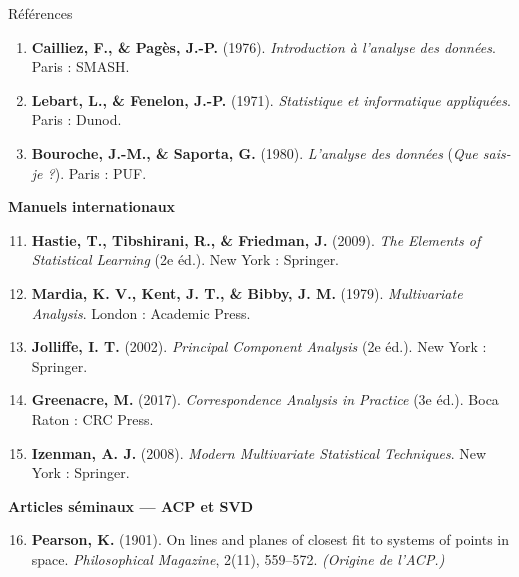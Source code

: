 \begin{frame}[allowframebreaks]{Références}
\begin{enumerate}
  \item \textbf{Cailliez, F., \& Pagès, J.-P.} (1976).
        \textit{Introduction à l'analyse des données}.
        Paris : SMASH.

  \item \textbf{Lebart, L., \& Fenelon, J.-P.} (1971).
        \textit{Statistique et informatique appliquées}.
        Paris : Dunod.

  \item \textbf{Bouroche, J.-M., \& Saporta, G.} (1980).
        \textit{L'analyse des données} (\textit{Que sais-je ?}).
        Paris : PUF.
\end{enumerate}

\framebreak

\textbf{\large Manuels internationaux}\\[6pt]

\begin{enumerate}
  \setcounter{enumi}{10}
  \item \textbf{Hastie, T., Tibshirani, R., \& Friedman, J.} (2009).
        \textit{The Elements of Statistical Learning} (2e éd.).
        New York : Springer.

  \item \textbf{Mardia, K. V., Kent, J. T., \& Bibby, J. M.} (1979).
        \textit{Multivariate Analysis}. London : Academic Press.

  \item \textbf{Jolliffe, I. T.} (2002).
        \textit{Principal Component Analysis} (2e éd.).
        New York : Springer.

  \item \textbf{Greenacre, M.} (2017).
        \textit{Correspondence Analysis in Practice} (3e éd.).
        Boca Raton : CRC Press.

  \item \textbf{Izenman, A. J.} (2008).
        \textit{Modern Multivariate Statistical Techniques}.
        New York : Springer.
\end{enumerate}

\framebreak

\textbf{\large Articles séminaux — ACP et SVD}\\[6pt]

\begin{enumerate}
  \setcounter{enumi}{15}
  \item \textbf{Pearson, K.} (1901).
        On lines and planes of closest fit to systems of points in space.
        \textit{Philosophical Magazine}, 2(11), 559--572. \emph{(Origine de l'ACP.)}


\end{enumerate}
\end{frame}

